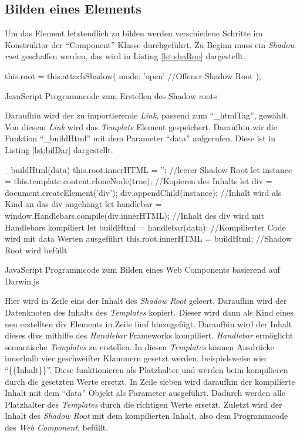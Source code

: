 \documentclass[12pt, paper=a4, bibtotoc, toc=listof, headsepline=true]{scrreprt}
\begin{document}
	\subsection{Bilden eines Elements}
	Um das Element letztendlich zu bilden werden verschiedene Schritte im Konstruktor der \enquote{Component} Klasse durchgeführt. Zu Beginn muss ein \emph{Shadow root} geschaffen werden, das wird in Listing \ref{lst:shaRoo} dargestellt.
	\begin{listing}
		\begin{JavaScriptcode*}{}
this.root = this.attachShadow({
   mode: 'open' //Offener Shadow Root
});
		\end{JavaScriptcode*}
		\caption[Erstellung des Shadow roots]{JavaScript Programmcode zum Erstellen des Shadow roots}
		\label{lst:shaRoo}  
	\end{listing}
	Daraufhin wird der zu importierende \emph{Link}, passend zum \enquote{\_htmlTag}, gewählt. Von diesem \emph{Link} wird das \emph{Template} Element gespeichert. Daraufhin wir die Funktion \enquote{\_buildHtml} mit dem Parameter \enquote{data} aufgerufen. Diese ist in Listing \ref{lst:bilDar} dargestellt.
		\begin{listing}
		\begin{JavaScriptcode*}{}
_buildHtml(data) {
   this.root.innerHTML = ''; //leerer Shadow Root
   let instance = this.template.content.cloneNode(true); //Kopieren des Inhalts
   let div = document.createElement('div'); 
   div.appendChild(instance); //Inhalt wird als Kind an das div angehängt
   let handlebar = window.Handlebars.compile(div.innerHTML); //Inhalt des div wird mit Handlebars kompiliert
   let buildHtml = handlebar(data); //Kompilierter Code wird mit data Werten ausgeführt
   this.root.innerHTML = buildHtml; //Shadow Root wird befüllt
}
		\end{JavaScriptcode*}
		\caption[Bilden des Web Components]{JavaScript Programmcode zum Bilden eines Web Components basierend auf Darwin.js}
		\label{lst:bilDar}
		\end{listing}
	Hier wird in Zeile eins der Inhalt des \emph{Shadow Root} geleert. Daraufhin wird der Datenknoten des Inhalts des \emph{Templates} kopiert. Dieser wird dann als Kind eines neu erstellten div Elements in Zeile fünf hinzugefügt. Daraufhin wird der Inhalt dieses divs mithilfe des \emph{Handlebar} Frameworks kompiliert. \emph{Handlebar} ermöglicht semantische \emph{Templates} zu erstellen. In diesen \emph{Templates} können Ausdrücke innerhalb vier geschweifter Klammern gesetzt werden, beispielsweise wie: \enquote{\{\{Inhalt\}\}}. Diese funktionieren als Platzhalter und werden beim kompilieren durch die gesetzten Werte ersetzt\cite{handlebars}. In Zeile sieben wird daraufhin der kompilierte Inhalt mit dem \enquote{data} Objekt als Parameter ausgeführt. Dadurch werden alle Platzhalter des \emph{Templates} durch die richtigen Werte ersetzt. Zuletzt wird der Inhalt des \emph{Shadow Root} mit dem kompilierten Inhalt, also dem Programmcode des \emph{Web Component}, befüllt.
\end{document}
